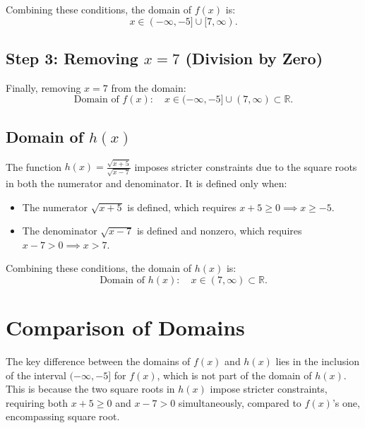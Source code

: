 \documentclass{article}
\begin{document}
Combining these conditions, the domain of $f(x)$ is:
\[
x \in (-\infty, -5] \cup [7, \infty).
\]

\subsection*{Step 3: Removing $x = 7$ (Division by Zero)}
Finally, removing $x = 7$ from the domain:
\[
\text{Domain of } f(x): \quad x \in (-\infty, -5] \cup (7, \infty) \subset \mathbb{R}.
\]

\subsection*{Domain of $h(x)$}
The function $h(x) = \frac{\sqrt{x+5}}{\sqrt{x-7}}$ imposes stricter constraints due to the square roots in both the numerator and denominator. It is defined only when:
\begin{itemize}
    \item The numerator $\sqrt{x+5}$ is defined, which requires $x + 5 \geq 0 \implies x \geq -5$.
    \item The denominator $\sqrt{x-7}$ is defined and nonzero, which requires $x - 7 > 0 \implies x > 7$.
\end{itemize}

Combining these conditions, the domain of $h(x)$ is:
\[
\text{Domain of } h(x): \quad x \in (7, \infty) \subset \mathbb{R}.
\]

\section*{Comparison of Domains}
The key difference between the domains of $f(x)$ and $h(x)$ lies in the inclusion of the interval $(-\infty, -5]$ for $f(x)$, which is not part of the domain of $h(x)$. This is because the two square roots in $h(x)$ impose stricter constraints, requiring both $x+5 \geq 0$ and $x-7 > 0$ simultaneously, compared to $f(x)$'s one, encompassing square root.
\end{document}
